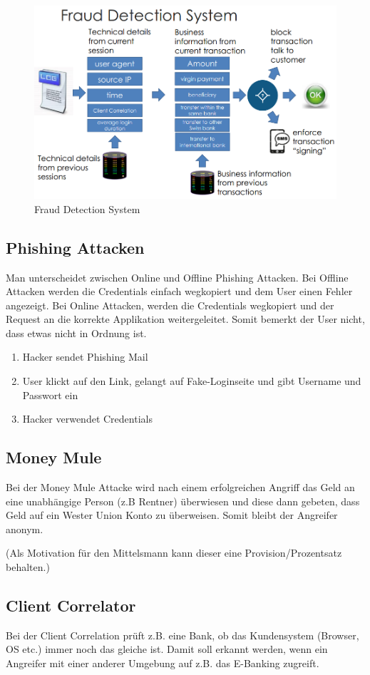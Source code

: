 \begin{figure}[h!]
	\centering
	\includegraphics[width=0.7\linewidth]{images/fraud_detection_2}
	\caption{Fraud Detection System}
	\label{fig:frauddetection2}
\end{figure}


\subsection{Phishing Attacken}
Man unterscheidet zwischen Online und Offline Phishing Attacken. Bei Offline Attacken werden die Credentials einfach wegkopiert und dem User einen Fehler angezeigt. Bei Online Attacken, werden die Credentials wegkopiert und der Request an die korrekte Applikation weitergeleitet. Somit bemerkt der User nicht, dass etwas nicht in Ordnung ist.
\begin{enumerate}
	\item Hacker sendet Phishing Mail
	\item User klickt auf den Link, gelangt auf Fake-Loginseite und gibt Username und Passwort ein
	\item Hacker verwendet Credentials
\end{enumerate}


\subsection{Money Mule}
Bei der Money Mule Attacke wird nach einem erfolgreichen Angriff das Geld an eine unabhängige Person (z.B Rentner) überwiesen und diese dann gebeten, dass Geld auf ein Wester Union Konto zu überweisen. Somit bleibt der Angreifer anonym.

(Als Motivation für den Mittelsmann kann dieser eine Provision/Prozentsatz behalten.)

\subsection{Client Correlator}
Bei der Client Correlation prüft z.B. eine Bank, ob das Kundensystem (Browser, OS etc.) immer noch das gleiche ist. Damit soll erkannt werden, wenn ein Angreifer mit einer anderer Umgebung auf z.B. das E-Banking zugreift.

